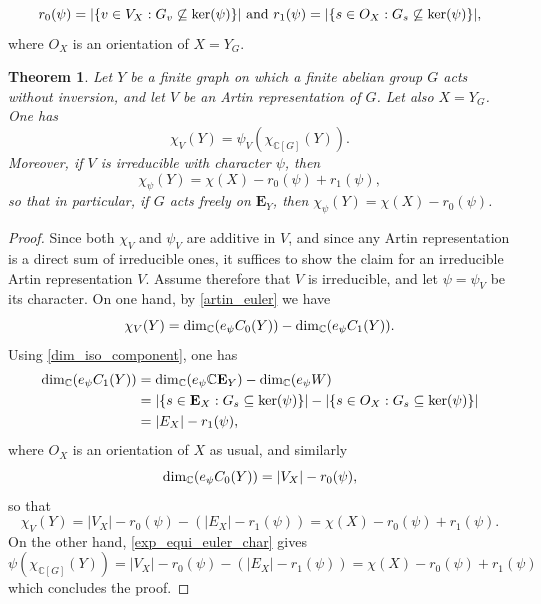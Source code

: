 \documentclass[11pt]{amsart}
\newtheorem{theorem}{Theorem}[section]
\numberwithin{equation}{section}
\theoremstyle{remark}
\theoremstyle{definition}
\begin{document}
$$r_{0}(\psi) = |\{v \in V_{X}: G_{v} \not \subseteq {\rm ker}(\psi) \}| \text{ and } r_{1}(\psi) = |\{s \in O_{X}: G_{s} \not\subseteq {\rm ker}(\psi) \}|,$$
where $O_{X}$ is an orientation of $X = Y_{G}$.
\begin{theorem} \label{art_eul_char}
Let $Y$ be a finite graph on which a finite abelian group $G$ acts without inversion, and let $V$ be an Artin representation of $G$.  Let also $X = Y_{G}$.  One has
$$\chi_{V}(Y) = \psi_{V}(\chi_{\mathbb{C}[G]}(Y)). $$
Moreover, if $V$ is irreducible with character $\psi$, then
$$\chi_{\psi}(Y) = \chi(X) - r_{0}(\psi) + r_{1}(\psi), $$
so that in particular, if $G$ acts freely on $\mathbf{E}_{Y}$, then $\chi_{\psi}(Y) = \chi(X) - r_{0}(\psi)$.
\end{theorem}
\begin{proof}
Since both $\chi_{V}$ and $\psi_{V}$ are additive in $V$, and since any Artin representation is a direct sum of irreducible ones, it suffices to show the claim for an irreducible Artin representation $V$.  Assume therefore that $V$ is irreducible, and let $\psi = \psi_{V}$ be its character.  On one hand, by \cref{artin_euler} we have 
$$\chi_{V}(Y) = {\rm dim}_{\mathbb{C}} (e_{\psi} C_{0}(Y)) - {\rm dim}_{\mathbb{C}} (e_{\psi} C_{1}(Y)). $$
Using \cref{dim_iso_component}, one has
\begin{equation*}
\begin{aligned}
{\rm dim}_{\mathbb{C}}(e_{\psi}C_{1}(Y)) &= {\rm dim}_{\mathbb{C}}(e_{\psi}\mathbb{C}\mathbf{E}_{Y}) - {\rm dim}_{\mathbb{C}}(e_{\psi}W) \\
&= |\{s \in \mathbf{E}_{X}: G_{s} \subseteq {\rm ker}(\psi)\}| -|\{s \in O_{X}: G_{s} \subseteq {\rm ker}(\psi)\}| \\
&= |E_{X}| - r_{1}(\psi),
\end{aligned}
\end{equation*}
where $O_{X}$ is an orientation of $X$ as usual, and similarly
$${\rm dim}_{\mathbb{C}}(e_{\psi}C_{0}(Y)) = |V_{X}| - r_{0}(\psi), $$
so that
$$\chi_{V}(Y) = |V_{X}| - r_{0}(\psi) - (|E_{X}| - r_{1}(\psi)) = \chi(X) - r_{0}(\psi) + r_{1}(\psi). $$ 
On the other hand, \cref{exp_equi_euler_char} gives
$$\psi(\chi_{\mathbb{C}[G]}(Y)) = |V_{X}| - r_{0}(\psi) - (|E_{X}| - r_{1}(\psi)) = \chi(X) - r_{0}(\psi) + r_{1}(\psi) $$
which concludes the proof.
\end{proof}


\end{document}
